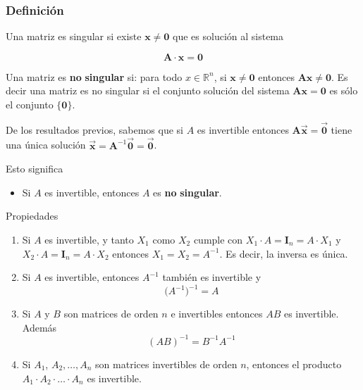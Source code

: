 \documentclass[
]{article}
\providecommand{\tightlist}{%
  \setlength{\itemsep}{0pt}\setlength{\parskip}{0pt}}
\begin{document}
\hypertarget{definiciuxf3n-3}{%
\subsubsection{Definición}\label{definiciuxf3n-3}}

Una matriz es singular si existe \(\mathbf{x}\ne \mathbf{0}\) que es
solución al sistema

\begin{equation}
\mathbf{A}\cdot \mathbf{x} = \mathbf{0}
\end{equation}

Una matriz es \textbf{no} \textbf{singular} si: para todo
\(x\in\mathbb{R}^{n}\), si \(\mathbf{x}\ne \mathbf{0}\) entonces
\(\mathbf{A}\mathbf{x}\ne \mathbf{0}\). Es decir una matriz es no
singular si el conjunto solución del sistema
\(\mathbf{A}\mathbf{x}=\mathbf{0}\) es sólo el conjunto
\(\{\mathbf{0}\}\).

De los resultados previos, sabemos que si \(A\) es invertible entonces
\(\mathbf{A}\vec{\mathbf{x}} = \vec{\mathbf{0}}\) tiene una única
solución
\(\vec{\mathbf{x}} = \mathbf{A}^{-1}\vec{\mathbf{0}}=\vec{\mathbf{0}}\).

Esto significa

\begin{itemize}
\tightlist
\item
  Si \(A\) es invertible, entonces \(A\) es \textbf{no}
  \textbf{singular}.
\end{itemize}

Propiedades

\begin{enumerate}
\def\labelenumi{\arabic{enumi})}
\item
  Si \(A\) es invertible, y tanto \(X_1\) como \(X_2\) cumple con
  \(X_1\cdot A=\mathbf{I}_n=A\cdot X_1\) y
  \(X_2\cdot A=\mathbf{I}_n=A\cdot X_2\) entonces \(X_1=X_2=A^{-1}\). Es
  decir, la inversa es única.
\item
  Si \(A\) es invertible, entonces \(A^{-1}\) también es invertible y \[
  \Big(A^{-1}\Big)^{-1} = A 
  \]
\item
  Si \(A\) y \(B\) son matrices de orden \(n\) e invertibles entonces
  \(AB\) es invertible. Además \begin{equation}
   (AB)^{-1} = B^{-1} A^{-1}
  \end{equation}
\item
  Si \(A_1\), \(A_2,\ldots,A_n\) son matrices invertibles de orden
  \(n\), entonces el producto \(A_1\cdot A_2\cdot\ldots\cdot A_n\) es
  invertible.
\end{enumerate}
\end{document}
